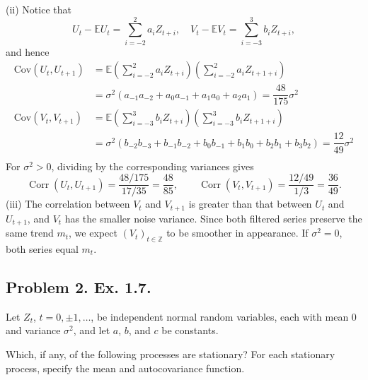 \documentclass[lang=en,11pt,a4paper,citestyle =authoryear]{elegantpaper}
\begin{document}
(ii) Notice that
\[
U_t - \mathbb{E}U_t = \sum\limits_{i=-2}^2 a_iZ_{t+i},\quad V_t - \mathbb{E}V_t = \sum\limits_{i=-3}^3 b_iZ_{t+i},
\]
and hence
\[
\begin{aligned}
    \text{Cov}(U_t,U_{t+1}) &= \mathbb{E}\left(\sum\limits_{i=-2}^2 a_iZ_{t+i}\right)\left(\sum\limits_{i=-2}^2 a_iZ_{t+1+i}\right) \\
    &= \sigma^2(a_{-1}a_{-2} + a_0a_{-1} + a_1a_0 + a_2a_1) = \dfrac{48}{175}\sigma^2 \\
    \text{Cov}(V_t,V_{t+1}) &= \mathbb{E}\left(\sum\limits_{i=-3}^3 b_iZ_{t+i}\right)\left(\sum\limits_{i=-3}^3 b_iZ_{t+1+i}\right) \\
    &= \sigma^2(b_{-2}b_{-3} + b_{-1}b_{-2} + b_0b_{-1} + b_1b_0 + b_2b_1 + b_3b_2)= \dfrac{12}{49}\sigma^2 \\
\end{aligned}
\]
For $\sigma^2>0$, dividing by the corresponding variances gives
\[
\operatorname{Corr}(U_t,U_{t+1})=\frac{48/175}{17/35}=\frac{48}{85},
\qquad
\operatorname{Corr}(V_t,V_{t+1})=\frac{12/49}{1/3}=\frac{36}{49}.
\]
(iii) The correlation between $V_t$ and $V_{t+1}$ is greater than that between
$U_t$ and $U_{t+1}$, and $V_t$ has the smaller noise variance. Since both filtered
series preserve the same trend $m_t$, we expect $(V_t)_{t\in\mathbb Z}$ to be
smoother in appearance. If $\sigma^2=0$, both series equal $m_t$.
\par
\vspace{0.5em}

\subsection*{Problem 2. Ex. 1.7.} 

Let $Z_t$, $t=0,\pm1,\ldots$, be independent normal random variables,
each with mean $0$ and variance $\sigma^2$, and let $a$, $b$, and $c$
be constants.

Which, if any, of the following processes are stationary? For each
stationary process, specify the mean and autocovariance function.
\end{document}
